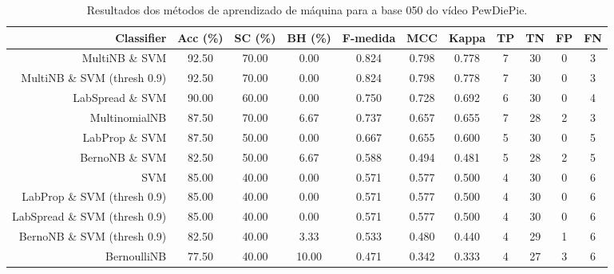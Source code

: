 \begin{table}[!htb]
\centering
\caption{Resultados dos métodos de aprendizado de máquina para a base 050 do vídeo PewDiePie.}
\label{tab:PewDiePie-050}
\begin{tabular}{r|c|c|c|c|c|c|c|c|c|c}
\hline\hline
Classifier & Acc (\%) & SC (\%) & BH (\%) & F-medida & MCC & Kappa & TP & TN & FP & FN \\ \hline
MultiNB \& SVM & 92.50 & 70.00 & 0.00 & 0.824 & 0.798 & 0.778 & 7 & 30 & 0 & 3 \\ 
MultiNB \& SVM (thresh 0.9) & 92.50 & 70.00 & 0.00 & 0.824 & 0.798 & 0.778 & 7 & 30 & 0 & 3 \\ 
LabSpread \& SVM & 90.00 & 60.00 & 0.00 & 0.750 & 0.728 & 0.692 & 6 & 30 & 0 & 4 \\ 
MultinomialNB & 87.50 & 70.00 & 6.67 & 0.737 & 0.657 & 0.655 & 7 & 28 & 2 & 3 \\ 
LabProp \& SVM & 87.50 & 50.00 & 0.00 & 0.667 & 0.655 & 0.600 & 5 & 30 & 0 & 5 \\ 
BernoNB \& SVM & 82.50 & 50.00 & 6.67 & 0.588 & 0.494 & 0.481 & 5 & 28 & 2 & 5 \\ 
SVM & 85.00 & 40.00 & 0.00 & 0.571 & 0.577 & 0.500 & 4 & 30 & 0 & 6 \\ 
LabProp \& SVM (thresh 0.9) & 85.00 & 40.00 & 0.00 & 0.571 & 0.577 & 0.500 & 4 & 30 & 0 & 6 \\ 
LabSpread \& SVM (thresh 0.9) & 85.00 & 40.00 & 0.00 & 0.571 & 0.577 & 0.500 & 4 & 30 & 0 & 6 \\ 
BernoNB \& SVM (thresh 0.9) & 82.50 & 40.00 & 3.33 & 0.533 & 0.480 & 0.440 & 4 & 29 & 1 & 6 \\ 
BernoulliNB & 77.50 & 40.00 & 10.00 & 0.471 & 0.342 & 0.333 & 4 & 27 & 3 & 6 \\ 
\hline\hline
\end{tabular}
\end{table}
